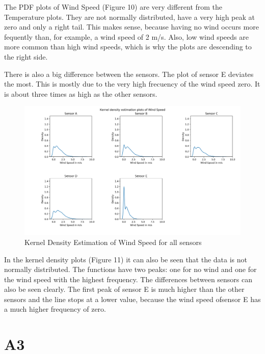 \documentclass{article}
\begin{document}
            The PDF plots of Wind Speed (Figure 10) are very different from the Temperature
            plots. They are not normally distributed, have a very high peak at zero and 
            only a right tail. This makes sense, because having no wind occurs more 
            fequently than, for example, a wind speed of 2 m/s. Also, low wind speeds are more common
            than high wind speeds, which is why the plots are descending to the right side.
            \par There is also a big difference between the sensors. The plot of sensor E deviates 
            the most. This is mostly due to the very high frecuency of the wind speed zero. It is 
            about three times as high as the other sensors. 

            \begin{figure}[H]
                \includegraphics[width=\textwidth]{kde_windspeed}
                \caption{Kernel Density Estimation of Wind Speed for all sensors}
            \end{figure}

            In the kernel density plots (Figure 11) it can also be seen that the data is not normally distributed.
            The functions have two peaks: one for no wind and one for the wind speed with
            the highest frequency. The differences between sensors can also be seen clearly.
            The first peak of sensor E is much higher than the other sensors and the line
            stops at a lower value, because the wind speed ofsensor E has a much higher 
            frequency of zero.  
            
            



\section{A3}
\end{document}
